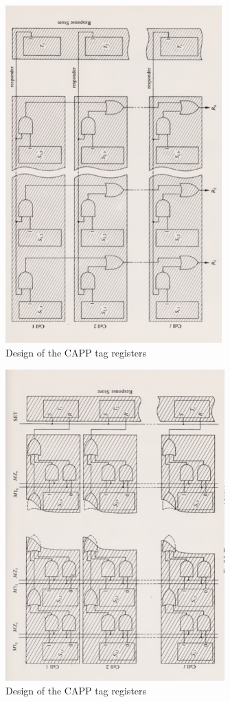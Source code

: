 \begin{figure}
  \includegraphics[height=13cm]{FPGA-CAPP research paper/images/read_lines.png}
  \caption{Design of the CAPP tag registers}
  \label{read_lines}
\end{figure}

\begin{figure}
  \includegraphics[height=12cm]{FPGA-CAPP research paper/images/mismatch_lines.png}
  \caption{Design of the CAPP tag registers}
  \label{mismatch_lines}
\end{figure}

